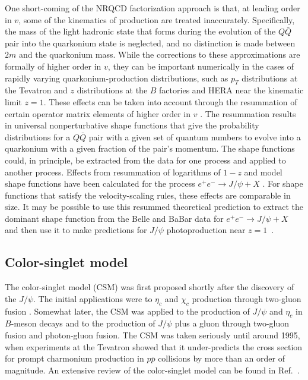 One short-coming of the NRQCD factorization approach is that, at
leading order in $v$, some of the kinematics of production are treated
inaccurately. Specifically, the mass of the light hadronic state that
forms during the evolution of the $Q\bar Q$ pair into the quarkonium
state is neglected, and no distinction is made between $2m$ and the
quarkonium mass. While the corrections to these approximations are
formally of higher order in $v$, they can be important numerically in
the cases of rapidly varying quarkonium-production distributions, such
as $p_T$ distributions at the Tevatron and $z$ distributions at the $B$
factories and HERA near the kinematic limit $z=1$. These effects can be
taken into account through the resummation of certain operator matrix
elements of higher order in $v$ \cite{Beneke:1997qw}. The resummation
results in universal nonperturbative shape functions that give the
probability distributions for a $Q\bar Q$ pair with a given set of
quantum numbers to evolve into a quarkonium with a given fraction of the 
pair's momentum. The shape functions could, in principle, be extracted 
from the data for one process and applied to another
process. Effects from resummation of logarithms of $1-z$ and model shape
functions have been calculated for the process $e^+e^-\to J/\psi+X$
\cite{Fleming:2003gt}. For shape functions that satisfy the
velocity-scaling rules, these effects are comparable in size. It may be
possible to use this resummed theoretical prediction to extract the
dominant shape function from the Belle and BaBar data for $e^+e^-\to
J/\psi+X$ and then use it to make predictions for $J/\psi$
photoproduction near $z=1$~\cite{Beneke:1999gq}. 

\subsection{Color-singlet model}
\label{prodsec:nrqcdCSM}

The color-singlet model (CSM) was first proposed shortly after the
discovery of the $J/\psi$. The initial applications were to $\eta_c$ and
$\chi_c$ production through two-gluon fusion
\cite{Einhorn:1975ua,Ellis:1976fj,Carlson:1976cd,Kuhn:1979kb}. Somewhat
later, the CSM was applied to the production of $J/\psi$ and $\eta_c$ in
$B$-meson decays \cite{DeGrand:wf,Kuhn:1979zb,Wise:1979tp} and to the
production of $J/\psi$ plus a gluon
\cite{Chang:1979nn,Baier:1981zz,Baier:1981uk,Baier:1983va,%
Berger:1980ni,Keung:1981gs} through two-gluon fusion and photon-gluon
fusion.  The CSM was taken seriously until around 1995, when
experiments at the Tevatron showed that it under-predicts the cross
section for prompt charmonium production in $p \bar p$ collisions by
more than an order of magnitude.  An extensive review of the
color-singlet model can be found in Ref.~\cite{Schuler:1994hy}.

